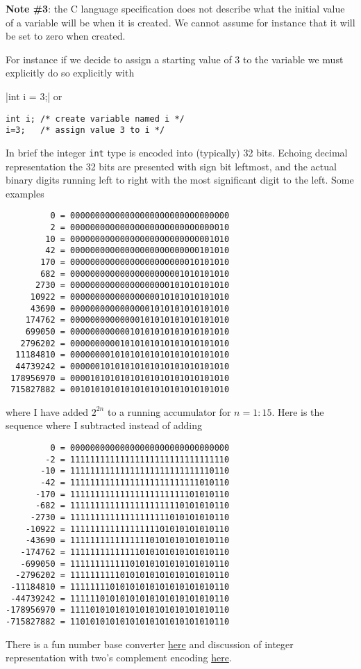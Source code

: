 {\bf Note \#3}: the C language specification does not describe what the initial value of a variable will be when it is created. We cannot assume for instance that it will be set to zero when created. 

For instance if we decide to assign a starting value of 3 to the variable we must explicitly do so explicitly with

|int i = 3;|
or 
\begin{verbatim}
int i; /* create variable named i */
i=3;   /* assign value 3 to i */
\end{verbatim}


In brief the integer \texttt{int} type is encoded into (typically) 32 bits. Echoing decimal representation the 32 bits are presented with sign bit leftmost, and the actual binary digits running left to right with the most significant digit to the left. Some examples

\begin{verbatim}
         0 = 00000000000000000000000000000000
         2 = 00000000000000000000000000000010
        10 = 00000000000000000000000000001010
        42 = 00000000000000000000000000101010
       170 = 00000000000000000000000010101010
       682 = 00000000000000000000001010101010
      2730 = 00000000000000000000101010101010
     10922 = 00000000000000000010101010101010
     43690 = 00000000000000001010101010101010
    174762 = 00000000000000101010101010101010
    699050 = 00000000000010101010101010101010
   2796202 = 00000000001010101010101010101010
  11184810 = 00000000101010101010101010101010
  44739242 = 00000010101010101010101010101010
 178956970 = 00001010101010101010101010101010
 715827882 = 00101010101010101010101010101010
 \end{verbatim}
 where I have added $2^{2n}$ to a running accumulator for $n=1:15$. Here is the sequence where I subtracted instead of adding
 \begin{verbatim}
         0 = 00000000000000000000000000000000
        -2 = 11111111111111111111111111111110
       -10 = 11111111111111111111111111110110
       -42 = 11111111111111111111111111010110
      -170 = 11111111111111111111111101010110
      -682 = 11111111111111111111110101010110
     -2730 = 11111111111111111111010101010110
    -10922 = 11111111111111111101010101010110
    -43690 = 11111111111111110101010101010110
   -174762 = 11111111111111010101010101010110
   -699050 = 11111111111101010101010101010110
  -2796202 = 11111111110101010101010101010110
 -11184810 = 11111111010101010101010101010110
 -44739242 = 11111101010101010101010101010110
-178956970 = 11110101010101010101010101010110
-715827882 = 11010101010101010101010101010110
 \end{verbatim}
 There is a fun number base converter \href{https://www.binaryconvert.com/}{here} and discussion of integer representation with two's complement encoding \href{https://en.wikipedia.org/wiki/Two%27s_complement}{here}. 
 
